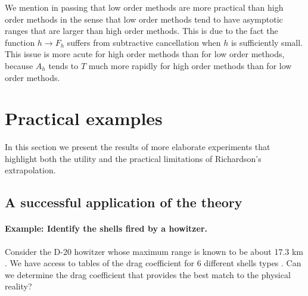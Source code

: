 \documentclass[runningheads]{llncs}
\begin{document}
We mention in passing that low order methods are more practical than high order methods in the sense that low order methods tend to have asymptotic ranges that are larger than high order methods.
This is due to the fact the function $h \rightarrow F_h$ suffers from subtractive cancellation when $h$ is sufficiently small. This issue is more acute for high order methods than for low order methods, because $A_h$ tends to $T$ much more rapidly for high order methods than for low order methods.


\section{Practical examples}

In this section we present the results of more elaborate experiments that highlight both the utility and the practical limitations of Richardson's extrapolation.

\subsection{A successful application of the theory}


\paragraph{Example: Identify the shells fired by a howitzer.}

Consider the D-20 howitzer whose maximum range is known to be about 17.3 km \cite{foss1976artillery}. We have access to tables of the drag coefficient for 6 different shells types \cite{jbmballistics}. Can we determine the drag coefficient that provides the best match to the physical reality?
\end{document}
